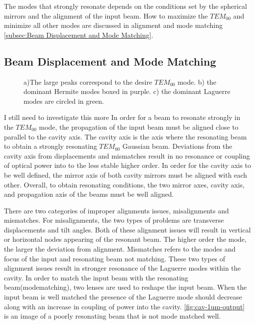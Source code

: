 \documentclass[11pt,a4paper]{book}
\newcommand{\imginput}[1]{} %
\begin{document}
			The modes that strongly resonate depends on the conditions set by the spherical mirrors and the alignment of the input beam.
			How to maximize the $TEM_{00}$ and minimize all other modes are discussed in alignment and mode matching \autoref{subsec:Beam Displacement and Mode Matching}.
		
		\subsection {Beam Displacement and Mode Matching}
			\label{subsec:Beam Displacement and Mode Matching}
			
			\begin{figure} [!ht]
				\centering
				\def\svgwidth{\columnwidth}
				\resizebox{150mm}{!}{\imginput{images/cav-1um-output.pdf_tex}}
				\caption{a)The large peaks correspond to the desire $TEM_{00}$ mode. b) the dominant Hermite modes boxed in purple. c) the dominant Laguerre modes are circled in green.
				}
				\label{fig:cav-1um-output}
			\end{figure}		
			I still need to investigate this more
			In order for a beam to resonate strongly in the $TEM_{00}$ mode, the propagation of the input beam must be aligned close to parallel to the cavity axis.
			The cavity axis is the axis where the resonating beam to obtain a strongly resonating $TEM_{00}$ Gaussian beam. Deviations from the cavity axis from displacements and mismatches result in no resonance or coupling of optical power into to the less stable higher order. In order for the cavity axis to be well defined, the mirror axis of both cavity mirrors must be aligned with each other. Overall, to obtain resonating conditions, the two mirror axes, cavity axis, and propagation axis of the beams must be well aligned.
			
			There are two categories of improper alignments issues, misalignments and mismatches. For misalignments, the two types of problems are transverse displacements and tilt angles. Both of these alignment issues will result in vertical or horizontal nodes appearing of the resonant beam. The higher order the mode, the larger the deviation from alignment. 
			Mismatches refers to the modes and focus of the input and resonating beam not matching. These two types of alignment issues result in stronger resonance of the Laguerre modes within the cavity. In order to match the input beam with the resonating beam(modematching), two lenses are used to reshape the input beam. When the input beam is well matched the presence of the Laguerre mode should decrease along with an increase in coupling of power into the cavity. \autoref{fig:cav-1um-output} is an image of a poorly resonating beam that is not mode matched well.
			
\end{document}
